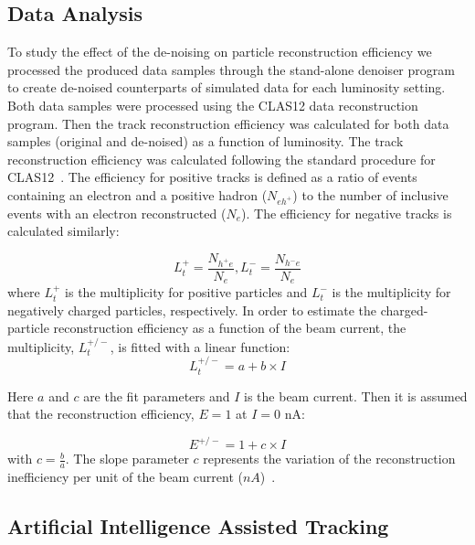 \subsection{Data Analysis}

To study the effect of the de-noising on particle reconstruction efficiency we processed the produced data samples through the stand-alone denoiser program to create de-noised counterparts of simulated data for each luminosity setting.  Both data samples were processed using the CLAS12 data reconstruction program. Then the track reconstruction efficiency was calculated for both data samples (original and de-noised) as a function of luminosity. The track reconstruction efficiency was calculated following the standard procedure for CLAS12~\cite{Stepanyan:2020bg}. The efficiency for positive tracks is defined as a ratio of 
events containing an electron and a positive hadron ($N_{eh^+}$) to the number of inclusive events with an electron reconstructed ($N_{e}$). The efficiency for negative tracks is calculated similarly:

\begin{equation}
L_t^+ = \frac{N_{h^+e}}{N_e} , L_t^- = \frac{N_{h^-e}}{N_e} 
\label{eq::eff}
\end{equation}
where $L_t^+$ is the multiplicity for positive particles and $L_t^-$ is the multiplicity for negatively
charged particles, respectively. In order to estimate the charged-particle reconstruction efficiency
as a function of the beam current, the multiplicity, $L_t^{+/-}$, is fitted with a linear function:
\begin{equation}
L_t^{+/-} = a + b\times I
\label{eq::eff2}
\end{equation}

Here $a$ and $c$ are the fit parameters and $I$ is the beam current. Then it is assumed that the
reconstruction efficiency, $E=1$ at $I=0$ nA:

\begin{equation}
E^{+/-} = 1 + c \times I
\label{eq::eff3}
\end{equation}
with $c=\frac{b}{a}$. The slope parameter $c$ represents the variation of the reconstruction
inefficiency per unit of the beam current ($nA$)~\cite{Stepanyan:2020bg}.

\subsection{Artificial Intelligence Assisted Tracking}

